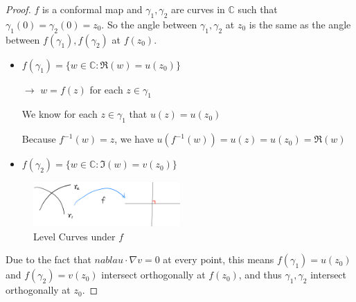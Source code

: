 \begin{proof}
    $f$ is a conformal map and $\gamma_1, \gamma_2$ are curves in $\mathbb{C}$ such that $\gamma_1(0) = \gamma_2(0) = z_0$. So the angle between $\gamma_1, \gamma_2$ at $z_0$ is the same as the angle between $f(\gamma_1), f(\gamma_2)$ at $f(z_0)$.
    \begin{itemize}
        \item $f(\gamma_1) = \{w \in \mathbb{C} :\Re (w) = u(z_0)\}$
        \item[$\rightarrow$] $w = f(z)$ for each $z \in \gamma_1$
        \item[] We know for each $z \in \gamma_1$ that $u(z) = u(z_0)$
        \item[] Because $f^{-1}(w) = z$, we have $u(f^{-1}(w)) = u(z) = u(z_0) = \Re (w)$
        \item $f(\gamma_2) = \{w \in \mathbb{C} :\Im (w) = v(z_0)\}$
    \end{itemize}
    \begin{figure}[H]
        \centering
        \includegraphics[width=0.5\textwidth]{LECTURE_17/conformal.png}
        \caption{Level Curves under $f$}
    \end{figure}
    Due to the fact that $nabla u \cdot \nabla v = 0$ at every point, this means $f(\gamma_1) = u(z_0)$ and $f(\gamma_2) = v(z_0)$ intersect orthogonally at $f(z_0)$, and thus $\gamma_1, \gamma_2$ intersect orthogonally at $z_0$.
\end{proof}

